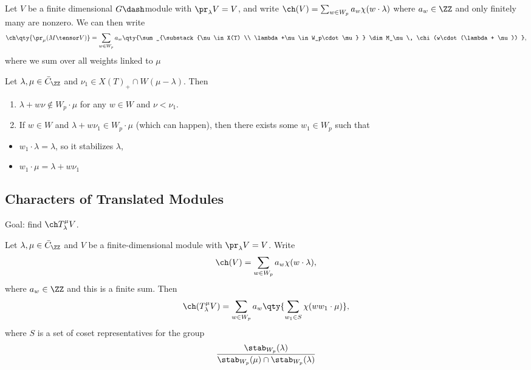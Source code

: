 Let \(V\) be a finite dimensional \(G\dash\)module with
\(\pr_\lambda V = V\), and write
\(\ch(V) = \sum_{w\in W_p} a_w \chi(w\cdot \lambda)\) where
\(a_w\in \ZZ\) and only finitely many are nonzero. We can then write
\begin{align*}  
\ch\qty{\pr_\mu(M\tensor V)} = \sum_{w\in W_p} a_w \qty{\sum_{\substack{\nu \in X(T) \\ \lambda+\nu \in W_p\cdot \mu} } \dim M_\nu \, \chi(w\cdot(\lambda + \nu))   }
,\end{align*} where we sum over all weights linked to \(\mu\)

\begin{lemma}[Technical]

Let \(\lambda,\mu \in \bar{C}_\ZZ\) and
\(\nu_1 \in X(T)_+ \cap W(\mu-\lambda)\). Then

\begin{enumerate}
\def\labelenumi{\alph{enumi}.}
\item
  \(\lambda + w\nu \not\in W_p\cdot \mu\) for any \(w\in W\) and
  \(\nu < \nu_1\).
\item
  If \(w\in W\) and \(\lambda + w\nu_1 \in W_p \cdot \mu\) (which can
  happen), then there exists some \(w_1\in W_p\) such that
\end{enumerate}

\begin{itemize}
\tightlist
\item
  \(w_1\cdot \lambda = \lambda\), so it stabilizes \(\lambda\),
\item
  \(w_1\cdot \mu = \lambda + w\nu_1\)
\end{itemize}

\end{lemma}

\hypertarget{characters-of-translated-modules}{%
\subsection{Characters of Translated
Modules}\label{characters-of-translated-modules}}

Goal: find \(\ch T_\lambda^\mu V\).

\begin{theorem}[?]

Let \(\lambda, \mu \in \bar{C}_\ZZ\) and \(V\) be a finite-dimensional
module with \(\pr_\lambda V = V\). Write
\begin{align*}
\ch(V) = \sum_{w\in W_p} a_w \chi(w\cdot \lambda)
,\end{align*} where \(a_w\in \ZZ\) and this is a finite sum. Then
\begin{align*}  
\ch(T_\lambda^\mu V) = 
\sum_{w\in W_p} a_w \qty{ 
  \sum_{w_1\in S} \chi(ww_1\cdot \mu)
},
\end{align*} where \(S\) is a set of coset representatives for the group
\begin{align*}
\stab_{W_p}(\lambda) \over \stab_{W_p}(\mu) \cap \stab_{W_p}(\lambda)
\end{align*}

\end{theorem}

